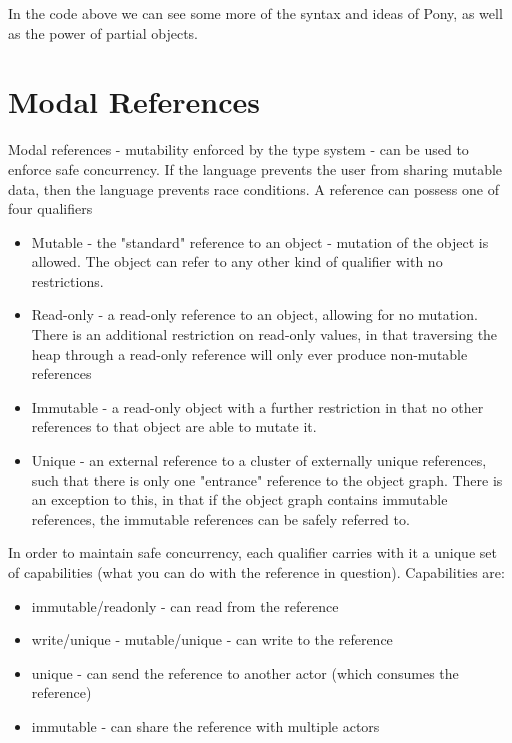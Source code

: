 \documentclass[11pt,a4paper]{report}
\begin{document}
In the code above we can see some more of the syntax and ideas of Pony, as well as the power of partial objects.

\section{Modal References}
\label{sec:immutability}

Modal references - mutability enforced by the type system\cite{tschantz2005javari}\cite{zibin2007object}\cite{zibin2010ownership} - can be used to enforce safe concurrency.
If the language prevents the user from sharing mutable data, then the language prevents race conditions.
A reference can possess one of four qualifiers\cite{microsoft2012}

\begin{itemize}
	\item Mutable - the "standard" reference to an object - mutation of the object is allowed.
		The object can refer to any other kind of qualifier with no restrictions.
	\item Read-only - a read-only reference to an object, allowing for no mutation.
		There is an additional restriction on read-only values, in that traversing the heap through a read-only reference will only ever produce non-mutable references
	\item Immutable - a read-only object with a further restriction in that no other references to that object are able to mutate it.
	\item Unique\cite{haller2010capabilities} - an external reference to a cluster of externally unique references, such that there is only one "entrance" reference to the object graph.
		There is an exception to this, in that if the object graph contains immutable references, the immutable references can be safely referred to.
\end{itemize}

In order to maintain safe concurrency, each qualifier carries with it a unique set of capabilities (what you can do with the reference in question).
Capabilities are:
\begin{itemize}[noitemsep]
	\item immutable/readonly - can read from the reference
	\item write/unique - mutable/unique - can write to the reference
	\item unique - can send the reference to another actor (which consumes the reference)
	\item immutable - can share the reference with multiple actors
\end{itemize}
\end{document}
